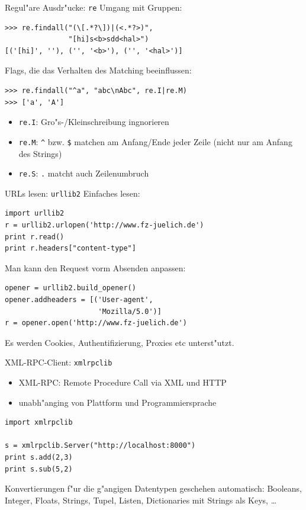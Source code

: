 \begin{frame}[fragile]{Regul"are Ausdr"ucke: \texttt{re}}
Umgang mit Gruppen:
\begin{lstlisting}[style=Shell]
>>> re.findall("(\[.*?\])|(<.*?>)", 
               "[hi]s<b>sdd<hal>")
[('[hi]', ''), ('', '<b>'), ('', '<hal>')]
\end{lstlisting}
\vspace*{2mm}
Flags, die das Verhalten des Matching beeinflussen:
\begin{lstlisting}[style=Shell]
>>> re.findall("^a", "abc\nAbc", re.I|re.M)
>>> ['a', 'A']
\end{lstlisting}
\begin{itemize}
\item \texttt{re.I}: Gro"s-/Kleinschreibung ingnorieren
\item \texttt{re.M}: \lstinline{^} bzw. \lstinline{$} matchen am Anfang/Ende jeder Zeile (nicht nur am Anfang des Strings) %
\item \texttt{re.S}: \lstinline{.} matcht auch Zeilenumbruch
\end{itemize}
\end{frame}


\begin{frame}[fragile]{URLs lesen: \texttt{urllib2}}
Einfaches lesen:
\begin{lstlisting}
import urllib2
r = urllib2.urlopen('http://www.fz-juelich.de')
print r.read()
print r.headers["content-type"]
\end{lstlisting}
Man kann den Request vorm Absenden anpassen:
\begin{lstlisting}
opener = urllib2.build_opener()
opener.addheaders = [('User-agent', 
                      'Mozilla/5.0')]
r = opener.open('http://www.fz-juelich.de')
\end{lstlisting}
Es werden Cookies, Authentifizierung, Proxies etc unterst"utzt.
\end{frame}


\begin{frame}[fragile]{XML-RPC-Client: \texttt{xmlrpclib}}
\begin{itemize}
\item XML-RPC: \alert{Remote Procedure Call} via XML und HTTP
\item unabh"anging von Plattform und Programmiersprache
\end{itemize}
\begin{lstlisting}[style=Python]
import xmlrpclib

s = xmlrpclib.Server("http://localhost:8000")
print s.add(2,3) 
print s.sub(5,2) 
\end{lstlisting}
Konvertierungen f"ur die g"angigen Datentypen geschehen automatisch: 
Booleans, Integer, Floats, Strings, Tupel, Listen, Dictionaries mit Strings als Keys, \dots
\end{frame}

